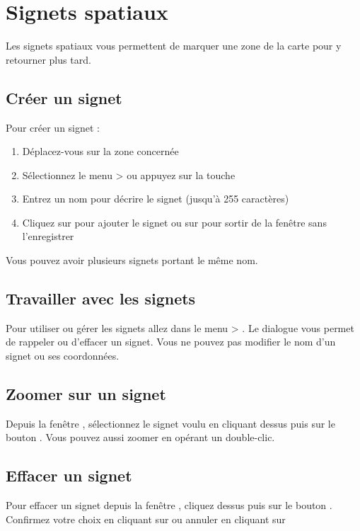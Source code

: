 \newpage


\section{Signets spatiaux} \label{sec:bookmarks}

Les signets spatiaux vous permettent de marquer une zone de la carte pour y retourner plus tard.

\subsection{Créer un signet}
Pour créer un signet :
\begin{enumerate}
\item Déplacez-vous sur la zone concernée
\item Sélectionnez le menu  >  ou appuyez sur la touche 
\item Entrez un nom pour décrire le signet (jusqu'à 255 caractères)
\item Cliquez sur  pour ajouter le signet ou sur  pour sortir de la fenêtre sans l'enregistrer
\end{enumerate}

Vous pouvez avoir plusieurs signets portant le même nom.

\subsection{Travailler avec les signets}
Pour utiliser ou gérer les signets allez dans le menu  > .
Le dialogue  vous permet de rappeler ou d'effacer un signet.
Vous ne pouvez pas modifier le nom d'un signet ou ses coordonnées.

\subsection{Zoomer sur un signet}
Depuis la fenêtre , sélectionnez le signet voulu en cliquant dessus puis sur le bouton . Vous pouvez aussi zoomer en opérant un double-clic.

\subsection{Effacer un signet}
Pour effacer un signet depuis la fenêtre , cliquez dessus puis sur le bouton .
Confirmez votre choix en cliquant sur  ou annuler en cliquant sur 

